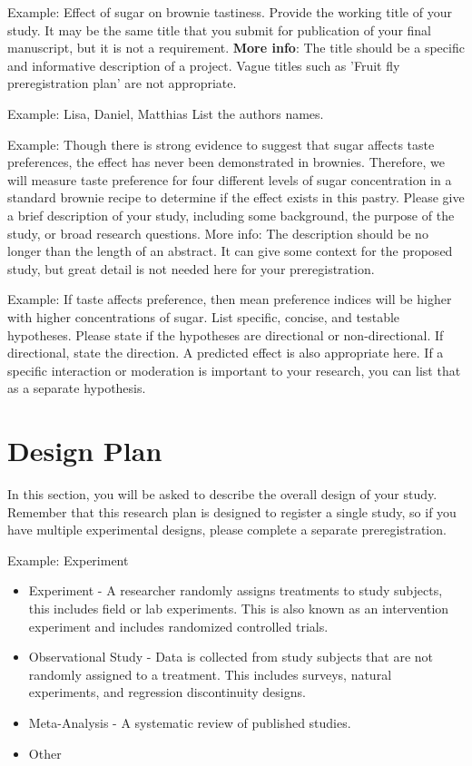 \documentclass[highlight, explanations]{prereg}
\begin{document}
{Example: Effect of sugar on brownie tastiness.}
{Provide the working title of your study. It may be the same title that you submit for publication of your final manuscript, but it is not a requirement.
\textbf{More info}: The title should be a specific and informative description of a project. Vague titles such as 'Fruit fly preregistration plan' are not appropriate.}

{Example: Lisa, Daniel, Matthias}
{List the authors names.}

{Example: Though there is strong evidence to suggest that sugar affects taste preferences, the effect has never been demonstrated in brownies. Therefore, we will measure taste preference for four different levels of sugar concentration in a standard brownie recipe to determine if the effect exists in this pastry.}
{Please give a brief description of your study, including some background, the purpose of the study, or broad research questions. More info: The description should be no longer than the length of an abstract. It can give some context for the proposed study, but great detail is not needed here for your preregistration.}

{Example: If taste affects preference, then mean preference indices will be higher with higher concentrations of sugar. }
{List specific, concise, and testable hypotheses. Please state if the hypotheses are directional or non-directional. If directional, state the direction. A predicted effect is also appropriate here. If a specific interaction or moderation is important to your research, you can list that as a separate hypothesis. }


\section{Design Plan}
In this section, you will be asked to describe the overall design of your study. Remember that this research plan is designed to register a single study, so if you have multiple experimental designs, please complete a separate preregistration.

{Example: Experiment}
{\begin{itemize}
    \item Experiment - A researcher randomly assigns treatments to study subjects, this includes field or lab experiments. This is also known as an intervention experiment and includes randomized controlled trials.
    \item Observational Study - Data is collected from study subjects that are not randomly assigned to a treatment. This includes surveys, natural experiments, and regression discontinuity designs.
    \item Meta-Analysis - A systematic review of published studies.
    \item Other
\end{itemize}
}
\end{document}
